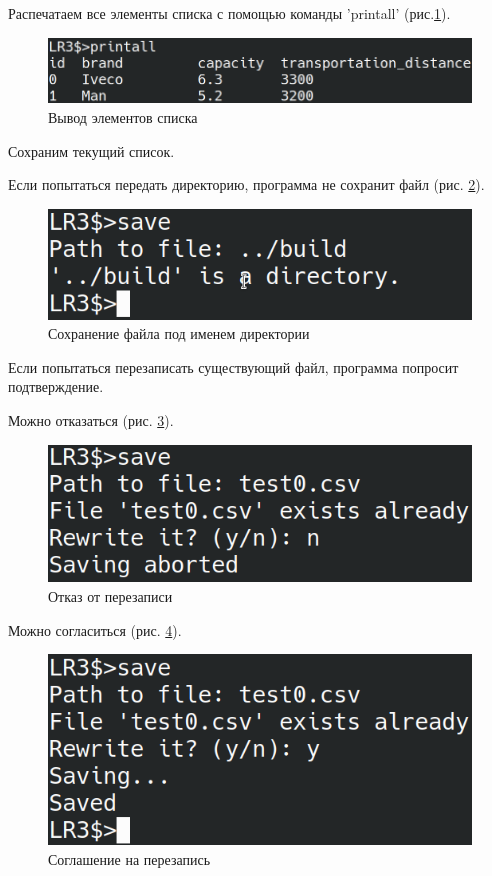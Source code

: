 Распечатаем все элементы списка с помощью команды 'printall' (рис.\ref{test.printall}).

\begin{figure}[hpt!]
    \centering
    \includegraphics[width=0.9\linewidth]{photo/test.printall}
    \caption{Вывод элементов списка}
    \label{test.printall}
\end{figure}

Сохраним текущий список.

Если попытаться передать директорию, программа не сохранит файл (рис. \ref{test.save.dir}). 

\begin{figure}[hpt!]
    \centering
    \includegraphics[width=0.9\linewidth]{photo/test.save.dir}
    \caption{Сохранение файла под именем директории}
    \label{test.save.dir}
\end{figure}

Если попытаться перезаписать существующий файл, программа попросит подтверждение.

Можно отказаться (рис. \ref{test.save.n}).

\begin{figure}[hpt!]
    \centering
    \includegraphics[width=0.9\linewidth]{photo/test.save.n}
    \caption{Отказ от перезаписи}
    \label{test.save.n}
\end{figure}

Можно согласиться (рис. \ref{test.save.y}).

\begin{figure}[hpt!]
    \centering
    \includegraphics[width=0.9\linewidth]{photo/test.save.y}
    \caption{Соглашение на перезапись}
    \label{test.save.y}
\end{figure}

